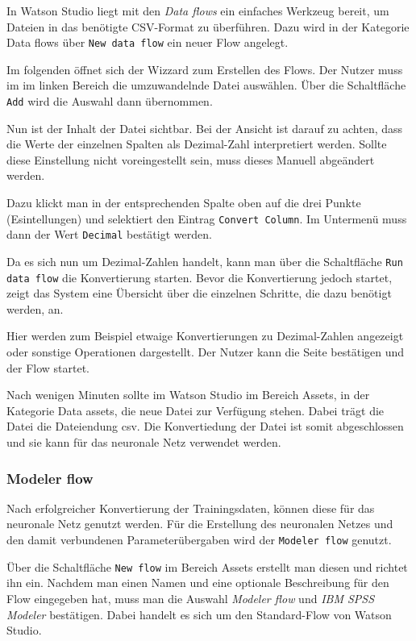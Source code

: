 In Watson Studio liegt mit den \textit{Data flows} ein einfaches Werkzeug bereit, um Dateien in das benötigte CSV-Format
zu überführen. Dazu wird in der Kategorie Data flows über \texttt{New data flow} ein neuer Flow angelegt.

Im folgenden öffnet sich der Wizzard zum Erstellen des Flows. Der Nutzer muss im im linken Bereich die umzuwandelnde Datei
auswählen. Über die Schaltfläche \texttt{Add} wird die Auswahl dann übernommen.

Nun ist der Inhalt der Datei sichtbar. Bei der Ansicht ist darauf zu achten, dass die Werte der einzelnen Spalten als
Dezimal-Zahl interpretiert werden. Sollte diese Einstellung nicht voreingestellt sein, muss dieses Manuell abgeändert
werden.

Dazu klickt man in der entsprechenden Spalte oben auf die drei Punkte (Esintellungen) und selektiert den Eintrag
\texttt{Convert Column}. Im Untermenü muss dann der Wert \texttt{Decimal} bestätigt werden.

Da es sich nun um Dezimal-Zahlen handelt, kann man über die Schaltfläche \texttt{Run data flow} die Konvertierung starten.
Bevor die Konvertierung jedoch startet, zeigt das System eine Übersicht über die einzelnen Schritte, die dazu benötigt
werden, an.

Hier werden zum Beispiel etwaige Konvertierungen zu Dezimal-Zahlen angezeigt oder sonstige Operationen dargestellt. Der
Nutzer kann die Seite bestätigen und der Flow startet.

Nach wenigen Minuten sollte im Watson Studio im Bereich Assets, in der Kategorie Data assets, die neue Datei zur Verfügung
stehen. Dabei trägt die Datei die Dateiendung csv. Die Konvertiedung der Datei ist somit abgeschlossen und sie kann für
das neuronale Netz verwendet werden.

\subsubsection{Modeler flow}
\label{subsub:modeler_flow}
Nach erfolgreicher Konvertierung der Trainingsdaten, können diese für das neuronale Netz genutzt werden. Für die
Erstellung des neuronalen Netzes und den damit verbundenen Parameterübergaben wird der \texttt{Modeler flow} genutzt.

Über die Schaltfläche \texttt{New flow} im Bereich Assets erstellt man diesen und richtet ihn ein. Nachdem man einen Namen
und eine optionale Beschreibung für den Flow eingegeben hat, muss man die Auswahl \textit{Modeler flow} und
\textit{IBM SPSS Modeler} bestätigen. Dabei handelt es sich um den Standard-Flow von Watson Studio.

